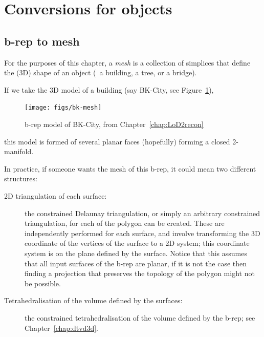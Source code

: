 %
\section{Conversions for objects}






\subsection{b-rep to mesh}

For the purposes of this chapter, a \emph{mesh} is a collection of simplices that define the (3D) shape of an object (\eg\ a building, a tree, or a bridge).

If we take the 3D model of a building (say BK-City, see Figure~\ref{fig:bk-mesh}), 
\begin{figure}
  \centering
  \texttt{[image: figs/bk-mesh]}
  \caption{b-rep model of BK-City, from Chapter~\ref{chap:LoD2recon}}%
\label{fig:bk-mesh}
\end{figure}
this model is formed of several planar faces (hopefully) forming a closed 2-manifold.

In practice, if someone wants the mesh of this b-rep, it could mean two different structures:
\begin{description}
  \item[2D triangulation of each surface:] the constrained Delaunay triangulation, or simply an arbitrary constrained triangulation, for each of the polygon can be created. These are independently performed for each surface, and involve transforming the 3D coordinate of the vertices of the surface to a 2D system; this coordinate system is on the plane defined by the surface. Notice that this assumes that all input surfaces of the b-rep are planar, if it is not the case then finding a projection that preserves the topology of the polygon might not be possible.
  \item[Tetrahedralisation of the volume defined by the surfaces:] the cons\-trained te\-tra\-he\-dra\-li\-sa\-tion of the volume defined by the b-rep; see Chapter~\ref{chap:dtvd3d}.
\end{description}

